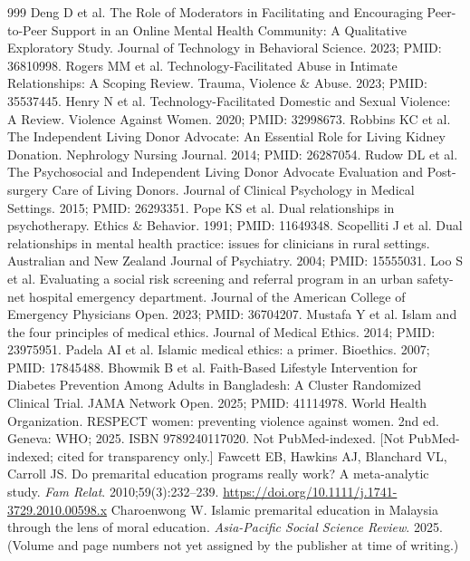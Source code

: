 \documentclass[11pt]{article}
\begin{document}
\begin{thebibliography}{999}
 Deng D et al. The Role of Moderators in Facilitating and Encouraging Peer-to-Peer Support in an Online Mental Health Community: A Qualitative Exploratory Study. Journal of Technology in Behavioral Science. 2023; PMID: 36810998.
 Rogers MM et al. Technology-Facilitated Abuse in Intimate Relationships: A Scoping Review. Trauma, Violence \& Abuse. 2023; PMID: 35537445.
 Henry N et al. Technology-Facilitated Domestic and Sexual Violence: A Review. Violence Against Women. 2020; PMID: 32998673.
 Robbins KC et al. The Independent Living Donor Advocate: An Essential Role for Living Kidney Donation. Nephrology Nursing Journal. 2014; PMID: 26287054.
 Rudow DL et al. The Psychosocial and Independent Living Donor Advocate Evaluation and Post-surgery Care of Living Donors. Journal of Clinical Psychology in Medical Settings. 2015; PMID: 26293351.
 Pope KS et al. Dual relationships in psychotherapy. Ethics \& Behavior. 1991; PMID: 11649348.
 Scopelliti J et al. Dual relationships in mental health practice: issues for clinicians in rural settings. Australian and New Zealand Journal of Psychiatry. 2004; PMID: 15555031.
 Loo S et al. Evaluating a social risk screening and referral program in an urban safety-net hospital emergency department. Journal of the American College of Emergency Physicians Open. 2023; PMID: 36704207.
 Mustafa Y et al. Islam and the four principles of medical ethics. Journal of Medical Ethics. 2014; PMID: 23975951.
 Padela AI et al. Islamic medical ethics: a primer. Bioethics. 2007; PMID: 17845488.
 Bhowmik B et al. Faith-Based Lifestyle Intervention for Diabetes Prevention Among Adults in Bangladesh: A Cluster Randomized Clinical Trial. JAMA Network Open. 2025; PMID: 41114978.
 World Health Organization. RESPECT women: preventing violence against women. 2nd ed. Geneva: WHO; 2025. ISBN 9789240117020. Not PubMed-indexed.
 [Not PubMed-indexed; cited for transparency only.] Fawcett EB, Hawkins AJ, Blanchard VL, Carroll JS. Do premarital education programs really work? A meta-analytic study. \emph{Fam Relat}. 2010;59(3):232--239. \url{https://doi.org/10.1111/j.1741-3729.2010.00598.x}
 Charoenwong W. Islamic premarital education in Malaysia through the lens of moral education. \emph{Asia-Pacific Social Science Review}. 2025. (Volume and page numbers not yet assigned by the publisher at time of writing.)
\end{thebibliography}
\end{document}
